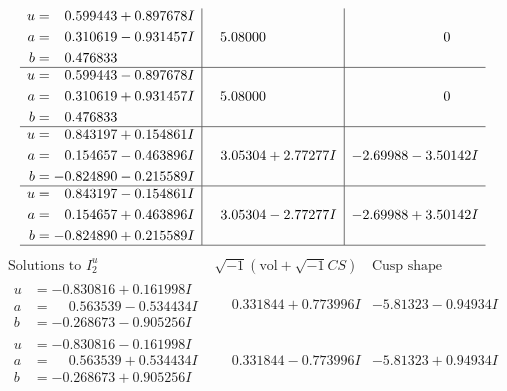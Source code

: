 \documentclass[1p]{elsarticle_modified}
\theoremstyle{definition}
\newcommand{\I}{\sqrt{-1}}
\begin{document}
$$\begin{array}{c|c|c}
\begin{aligned}
u &= \phantom{-}0.599443 + 0.897678 I \\
a &= \phantom{-}0.310619 - 0.931457 I \\
b &= \phantom{-}0.476833\phantom{ +0.000000I}\end{aligned}
 & \phantom{-}5.08000\phantom{ +0.000000I} & \phantom{-0.000000 } 0 \\ \hline\begin{aligned}
u &= \phantom{-}0.599443 - 0.897678 I \\
a &= \phantom{-}0.310619 + 0.931457 I \\
b &= \phantom{-}0.476833\phantom{ +0.000000I}\end{aligned}
 & \phantom{-}5.08000\phantom{ +0.000000I} & \phantom{-0.000000 } 0 \\ \hline\begin{aligned}
u &= \phantom{-}0.843197 + 0.154861 I \\
a &= \phantom{-}0.154657 - 0.463896 I \\
b &= -0.824890 - 0.215589 I\end{aligned}
 & \phantom{-}3.05304 + 2.77277 I & -2.69988 - 3.50142 I \\ \hline\begin{aligned}
u &= \phantom{-}0.843197 - 0.154861 I \\
a &= \phantom{-}0.154657 + 0.463896 I \\
b &= -0.824890 + 0.215589 I\end{aligned}
 & \phantom{-}3.05304 - 2.77277 I & -2.69988 + 3.50142 I\\
 \hline 
 \end{array}$$\newpage$$\begin{array}{c|c|c}  
\text{Solutions to }I^u_{2}& \I (\text{vol} + \sqrt{-1}CS) & \text{Cusp shape}\\
 \hline 
\begin{aligned}
u &= -0.830816 + 0.161998 I \\
a &= \phantom{-}0.563539 - 0.534434 I \\
b &= -0.268673 - 0.905256 I\end{aligned}
 & \phantom{-}0.331844 + 0.773996 I & -5.81323 - 0.94934 I \\ \hline\begin{aligned}
u &= -0.830816 - 0.161998 I \\
a &= \phantom{-}0.563539 + 0.534434 I \\
b &= -0.268673 + 0.905256 I\end{aligned}
 & \phantom{-}0.331844 - 0.773996 I & -5.81323 + 0.94934 I \\ \hline\begin{aligned}

\end{aligned}
\end{array}$$
\end{document}
